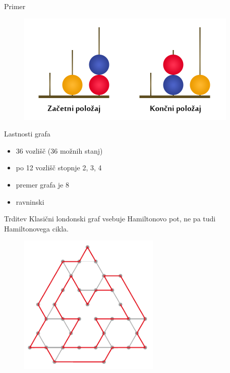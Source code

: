 \documentclass[dvipsnames]{beamer}
\begin{document}
\begin{frame}{Primer}
    \begin{figure}
        \centering
        \includegraphics[height=150pt]{../img/london-tower.png}
    \end{figure}
\end{frame}

\begin{frame}{Lastnosti grafa}
    \begin{itemize}
        \item 36 vozlišč (36 možnih stanj)
        \item po 12 vozlišč stopnje 2, 3, 4
        \item premer grafa je 8
        \item ravninski
    \end{itemize}
   	\begin{block}{Trditev}
   		Klasični londonski graf vsebuje Hamiltonovo pot, ne pa tudi Hamiltonovega cikla.
   	\end{block}
\end{frame}

\begin{frame}
    \begin{figure}
        \centering
        \includegraphics[height=190pt]{../img/tolgraph-ham-path.png}
    \end{figure}
\end{frame}
\end{document}
